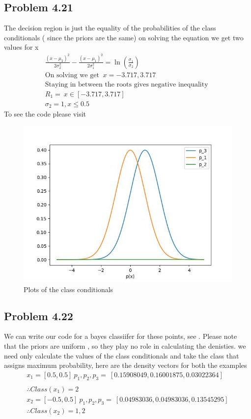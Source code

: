 \subsection{Problem 4.21}
The decision region is just the equality of the probabilities of the class conditionals ( since the priors are the same)
on solving the equation we get two values for x 
\begin{gather}
    \frac{(x - \mu_2)^2}{2 \sigma_2^2} - \frac{(x - \mu_1)^2}{2 \sigma_1^2} = \ln(\frac{\sigma_1}{\sigma_2}) \\
    \text{On solving we get } \ x = -3.717 , 3.717
    \\ 
    \text{Staying in between the roots gives negative inequality  } 
    \\R_1 = \ x \in [-3.717, 3.717] 
    \\
    \sigma_2 = 1 , x \le 0.5
\end{gather}
To see the code please visit \cite{CS3390}
\begin{figure}[!h]
    \centering
    \includegraphics[scale = 0.5]{Murphy-4.21.jpg}
    \caption{Plots of the class conditionals}
\end{figure}

\subsection{Problem 4.22}
We can write our code for a bayes classiifer for these points, see \cite{CS3390}. Please note that the 
priors are uniform , so they play no role in calculating the denisties.
we need only calculate the values of the class conditionals and take the class that assigns maximum probability,
here are the density vectors for both the examples
\begin{gather}
    x_1 = [0.5, 0.5] \ p_1, p_2, p_3  = \    [0.15908049 , 0.16001875,  0.03022364] \\
    \\
    \therefore   Class(x_1) = 2
    \\
    x_2 = [-0.5, 0.5] \ p_1, p_2, p_3 = \ [0.04983036 , 0.04983036,  0.13545295]
    \\
    \therefore Class(x_2) = 1,2
\end{gather}
